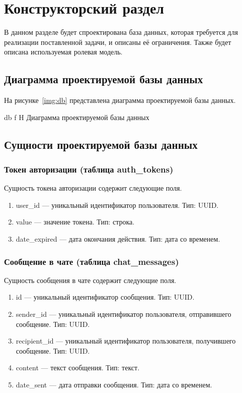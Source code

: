 \chapter{Конструкторский раздел}

В данном разделе будет спроектирована база данных, которая требуется для реализации поставленной задачи, и описаны её ограничения. Также будет описана используемая ролевая модель.

\section{Диаграмма проектируемой базы данных}

На рисунке~\ref{img:db} представлена диаграмма проектируемой базы данных.

    {db}
    {f}
    {H}
    {\textwidth}
    {Диаграмма проектируемой базы данных}

\section{Сущности проектируемой базы данных}

\subsection{Токен авторизации (таблица auth\_tokens)}

Сущность токена авторизации содержит следующие поля.

\begin{enumerate}
    \item user\_id --- уникальный идентификатор пользователя. Тип: UUID.
    \item value --- значение токена. Тип: строка.
    \item date\_expired --- дата окончания действия. Тип: дата со временем.
\end{enumerate}

\subsection{Сообщение в чате (таблица chat\_messages)}

Сущность сообщения в чате содержит следующие поля.

\begin{enumerate}
    \item id --- уникальный идентификатор сообщения. Тип: UUID.
    \item sender\_id --- уникальный идентификатор пользователя, отправившего сообщение. Тип: UUID.
    \item recipient\_id --- уникальный идентификатор пользователя, получившего сообщение. Тип: UUID.
    \item content --- текст сообщения. Тип: текст.
    \item date\_sent --- дата отправки сообщения. Тип: дата со временем.
\end{enumerate}

